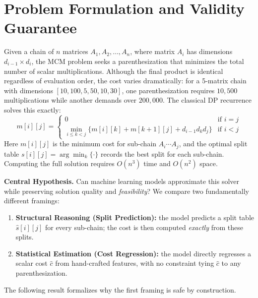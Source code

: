 \documentclass[conference]{IEEEtran}
\begin{document}
\section{Problem Formulation and Validity Guarantee}
\label{sec:formulation}

Given a chain of $n$ matrices $A_1, A_2, \ldots, A_n$, where matrix $A_i$ has
dimensions $d_{i-1} \times d_i$, the MCM problem seeks a parenthesization that
minimizes the total number of scalar multiplications. Although the final
product is identical regardless of evaluation order, the cost varies
dramatically: for a 5-matrix chain with dimensions $[10,100,5,50,10,30]$, one
parenthesization requires $10{,}500$ multiplications while another demands over
$200{,}000$. The classical DP recurrence \cite{cormen2009} solves this exactly:
\begin{equation}
m[i][j] =
\begin{cases}
0 & \text{if } i = j \\
\displaystyle\min_{i \le k < j} \bigl\{ m[i][k] + m[k{+}1][j] + d_{i-1} d_k d_j \bigr\} & \text{if } i < j
\end{cases}
\label{eq:dp}
\end{equation}
Here $m[i][j]$ is the minimum cost for sub-chain $A_i \cdots A_j$, and the
optimal split table $s[i][j] = \arg\min_k \{\cdot\}$ records the best split for
each sub-chain. Computing the full solution requires $O(n^3)$ time and $O(n^2)$
space.

\textbf{Central Hypothesis.} Can machine learning models approximate this
solver while preserving solution quality and \emph{feasibility}? We compare two
fundamentally different framings:
\begin{enumerate}
    \item \textbf{Structural Reasoning (Split Prediction):} the model predicts
    a split table $\hat{s}[i][j]$ for every sub-chain; the cost is then
    computed \emph{exactly} from these splits.
    \item \textbf{Statistical Estimation (Cost Regression):} the model directly
    regresses a scalar cost $\hat{c}$ from hand-crafted features, with no
    constraint tying $\hat{c}$ to any parenthesization.
\end{enumerate}

The following result formalizes why the first framing is safe by construction.
\end{document}
